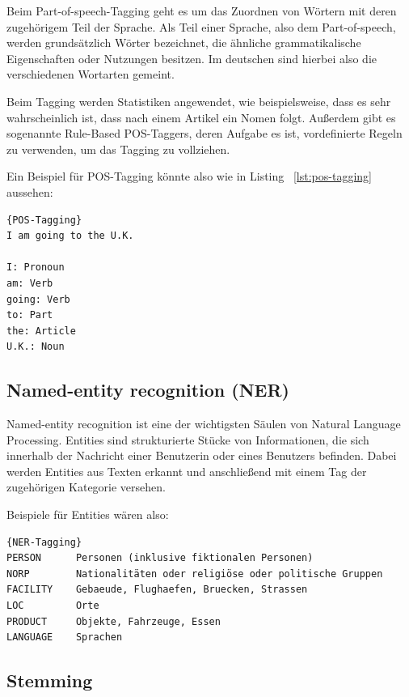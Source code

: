 Beim Part-of-speech-Tagging geht es um das Zuordnen von Wörtern mit deren zugehörigem Teil der Sprache.
Als Teil einer Sprache, also dem Part-of-speech, werden grundsätzlich Wörter bezeichnet, die ähnliche grammatikalische Eigenschaften oder Nutzungen besitzen.
Im deutschen sind hierbei also die verschiedenen Wortarten gemeint.

Beim Tagging werden Statistiken angewendet, wie beispielsweise, dass es sehr wahrscheinlich ist, dass nach einem Artikel ein Nomen folgt.
Außerdem gibt es sogenannte Rule-Based POS-Taggers, deren Aufgabe es ist, vordefinierte Regeln zu verwenden, um das Tagging zu vollziehen.\cite{machineLearningTextAnalysis, naturalLanguageProcessing}

Ein Beispiel für POS-Tagging könnte also wie in Listing ~\ref{lst:pos-tagging} aussehen:

\begin{lstlisting}[label={lst:pos-tagging},caption={Beispiel für POS-Tagging}]{POS-Tagging}
I am going to the U.K.

I: Pronoun
am: Verb
going: Verb
to: Part
the: Article
U.K.: Noun
\end{lstlisting}

\subsection{Named-entity recognition (NER)}\label{subsec:ner}

Named-entity recognition ist eine der wichtigsten Säulen von Natural Language Processing.
Entities sind strukturierte Stücke von Informationen, die sich innerhalb der Nachricht einer Benutzerin oder eines Benutzers befinden.
Dabei werden Entities aus Texten erkannt und anschließend mit einem Tag der zugehörigen Kategorie versehen.\cite{namedEntityRecognition}

Beispiele für Entities wären also:

\begin{lstlisting}[label={lst:ner-tagging},caption={Beispiele für Enitites}]{NER-Tagging}
PERSON      Personen (inklusive fiktionalen Personen)
NORP        Nationalitäten oder religiöse oder politische Gruppen
FACILITY    Gebaeude, Flughaefen, Bruecken, Strassen
LOC         Orte
PRODUCT     Objekte, Fahrzeuge, Essen
LANGUAGE    Sprachen
\end{lstlisting}

\subsection{Stemming}\label{subsec:stemming}

